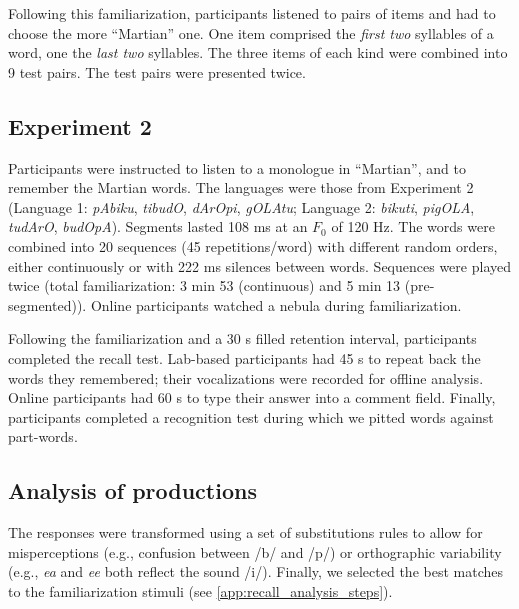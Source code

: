 \documentclass[]{article}
\begin{document}
Following this familiarization, participants listened to pairs of items and had to choose the more ``Martian'' one. One item comprised the \emph{first two} syllables of a word, one the \emph{last two} syllables. The three items of each kind were combined into 9 test pairs. The test pairs were presented twice.

\subsection{Experiment 2}

Participants were instructed to listen to a monologue in ``Martian'', and to remember the Martian words. The languages were those from \citet{Saffran-Science} Experiment 2 (Language 1: \emph{pAbiku}, \emph{tibudO}, \emph{dArOpi}, \emph{gOLAtu}; Language 2: \emph{bikuti}, \emph{pigOLA}, \emph{tudArO}, \emph{budOpA}). Segments lasted 108 ms at an \(F_0\) of 120 Hz. The words were combined into 20 sequences (45 repetitions/word) with different random orders, either continuously or with 222 ms silences between words. Sequences were played twice (total familiarization: 3 min 53 (continuous) and 5 min 13 (pre-segmented)). Online participants watched a nebula during familiarization.

Following the familiarization and a 30 s filled retention interval, participants completed the recall test. Lab-based participants had 45 s to repeat back the words they remembered; their vocalizations were recorded for offline analysis. Online participants had 60 s to type their answer into a comment field. Finally, participants completed a recognition test during which we pitted words against part-words.

\subsection{Analysis of productions}\label{analysis-of-productions}

The responses were transformed using a set of substitutions rules to allow for misperceptions (e.g., confusion between /b/ and /p/) or orthographic variability (e.g., \emph{ea} and \emph{ee} both reflect the sound /i/). Finally, we selected the best matches to the familiarization stimuli (see  \ref{app:recall_analysis_steps}).

\clearpage



\clearpage
\end{document}
